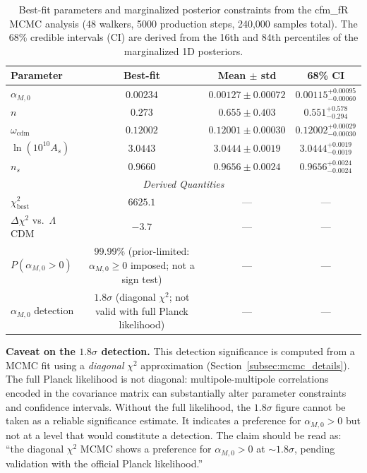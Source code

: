 \documentclass[aps,prd,twocolumn,superscriptaddress,nofootinbib]{revtex4-2}
\begin{document}
\begin{table}
\centering
\caption{Best-fit parameters and marginalized posterior constraints from the cfm\_fR MCMC analysis (48 walkers, 5000 production steps, 240{,}000 samples total). The 68\% credible intervals (CI) are derived from the 16th and 84th percentiles of the marginalized 1D posteriors.}
\label{tab:bestfit}
\begin{tabular}{lccc}
\toprule
\textbf{Parameter} & \textbf{Best-fit} & \textbf{Mean $\pm$ std} & \textbf{68\% CI} \\
\midrule
$\alpha_{M,0}$ & $0.00234$ & $0.00127 \pm 0.00072$ & $0.00115^{+0.00095}_{-0.00060}$ \\
$n$ & $0.273$ & $0.655 \pm 0.403$ & $0.551^{+0.578}_{-0.294}$ \\
$\omega_{\mathrm{cdm}}$ & $0.12002$ & $0.12001 \pm 0.00030$ & $0.12002^{+0.00029}_{-0.00030}$ \\
$\ln(10^{10}A_s)$ & $3.0443$ & $3.0444 \pm 0.0019$ & $3.0444^{+0.0019}_{-0.0019}$ \\
$n_s$ & $0.9660$ & $0.9656 \pm 0.0024$ & $0.9656^{+0.0024}_{-0.0024}$ \\
\midrule
\multicolumn{4}{c}{\textit{Derived Quantities}} \\
$\chi^2_{\mathrm{best}}$ & $6625.1$ & --- & --- \\
$\Delta\chi^2$ vs.\ $\Lambda$CDM & $-3.7$ & --- & --- \\
$P(\alpha_{M,0} > 0)$ & 99.99\% (prior-limited: $\alpha_{M,0} \geq 0$ imposed; not a sign test) & --- & --- \\
$\alpha_{M,0}$ detection & $1.8\sigma$ (diagonal $\chi^2$; not valid with full Planck likelihood) & --- & --- \\
\bottomrule
\end{tabular}
\end{table}

\textbf{Caveat on the $1.8\sigma$ detection.} This detection significance is computed from a MCMC fit using a \textit{diagonal} $\chi^2$ approximation (Section~\ref{subsec:mcmc_details}). The full Planck likelihood is not diagonal: multipole-multipole correlations encoded in the covariance matrix can substantially alter parameter constraints and confidence intervals. Without the full likelihood, the $1.8\sigma$ figure cannot be taken as a reliable significance estimate. It indicates a preference for $\alpha_{M,0} > 0$ but not at a level that would constitute a detection. The claim should be read as: ``the diagonal $\chi^2$ MCMC shows a preference for $\alpha_{M,0} > 0$ at $\sim 1.8\sigma$, pending validation with the official Planck likelihood.''
\end{document}
